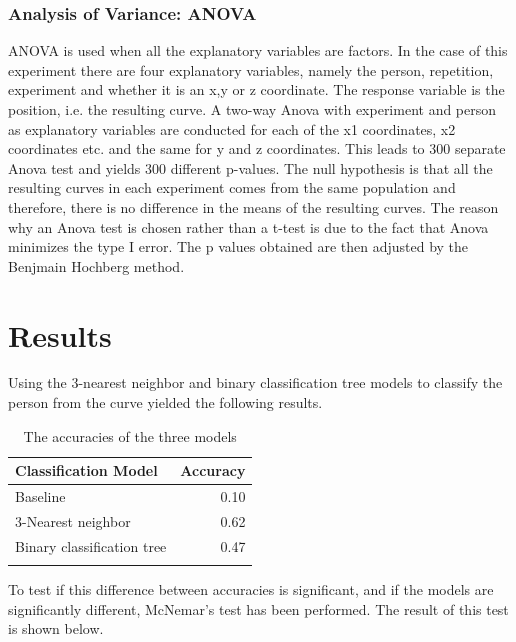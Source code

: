 \documentclass[11pt, fleqn, titlepage]{article}
\begin{document}
\subsubsection*{Analysis of Variance: ANOVA}
ANOVA is used when all the explanatory variables are factors. In the case of this experiment there are four explanatory variables, namely the person, repetition, experiment and whether it is an x,y or z coordinate. The response variable is the position, i.e. the resulting curve. A two-way Anova with experiment and person as explanatory variables are conducted for each of the x1 coordinates, x2 coordinates etc. and the same for y and z coordinates. This leads to 300 separate Anova test and yields 300 different p-values. The null hypothesis is that all the resulting curves in each experiment comes from the same population and therefore, there is no difference in the means of the resulting curves. The reason why an Anova test is chosen rather than a t-test is due to the fact that Anova minimizes the type I error. The p values obtained are then adjusted by the Benjmain Hochberg method. \cite{statbog}


\section{Results}
Using the 3-nearest neighbor and binary classification tree models to classify the person from the curve yielded the following results.

\begin{table}[h]
	\centering
	\begin{tabular}{l r}
		\toprule
		Classification Model       & Accuracy  \\ \midrule
		Baseline                   & 0.10      \\
		3-Nearest neighbor         & 0.62      \\ 
		Binary classification tree & 0.47      \\ \bottomrule
		\caption{The accuracies of the three models}
		\label{accuracies}
	\end{tabular}
\end{table}

\noindent To test if this difference between accuracies is significant, and if the models are significantly different, McNemar's test has been performed. The result of this test is shown below.
\end{document}
